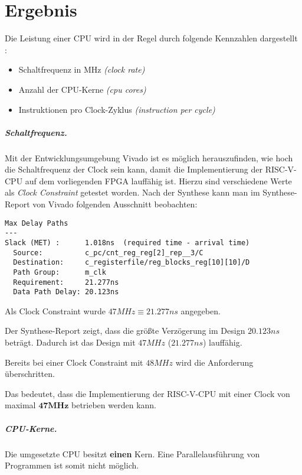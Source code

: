 \chapter{Ergebnis} %
\label{Ergebnis} %

Die Leistung einer CPU wird in der Regel durch folgende Kennzahlen
dargestellt \cite[S. 43]{Hennessy}:
\begin{itemize}
    \item Schaltfrequenz in MHz \emph{(clock rate)}
    \item Anzahl der CPU-Kerne \emph{(cpu cores)}
    \item Instruktionen pro Clock-Zyklus \emph{(instruction per cycle)} 
\end{itemize}

\paragraph{Schaltfrequenz.} Mit der Entwicklungsumgebung Vivado ist es
möglich herauszufinden, wie hoch die Schaltfrequenz der Clock sein kann,
damit die Implementierung der RISC-V-CPU auf dem vorliegenden FPGA
lauffähig ist. Hierzu sind verschiedene Werte als \emph{Clock Constraint}
getestet worden. Nach der Synthese kann man im Synthese-Report von
Vivado folgenden Ausschnitt beobachten: 
\begin{lstlisting}
Max Delay Paths
---
Slack (MET) :      1.018ns  (required time - arrival time)
  Source:          c_pc/cnt_reg_reg[2]_rep__3/C
  Destination:     c_registerfile/reg_blocks_reg[10][10]/D
  Path Group:      m_clk
  Requirement:     21.277ns  
  Data Path Delay: 20.123ns  
\end{lstlisting}
Als Clock Constraint wurde $47 MHz \equiv 21.277ns$ angegeben.

Der Synthese-Report zeigt, dass die größte Verzögerung im Design
$20.123ns$ beträgt. Dadurch ist das Design mit $47 MHz$ ($21.277ns$) lauffähig.

Bereits bei einer Clock Constraint mit $48 MHz$ wird die Anforderung
überschritten.

Das bedeutet, dass die Implementierung der RISC-V-CPU mit einer Clock
von maximal $\mathbf{47 MHz}$ betrieben werden kann.

\paragraph{CPU-Kerne.} Die umgesetzte CPU besitzt \textbf{einen} Kern.
Eine Parallelausführung von Programmen ist somit nicht möglich.


